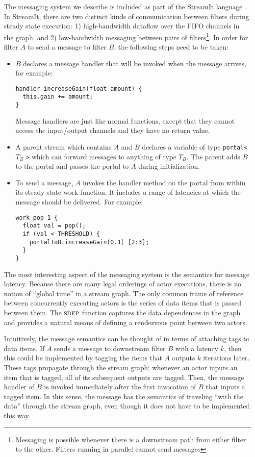 The messaging system we describe is included as part of the StreamIt
language~\cite{streamitcc}.  In StreamIt, there are two distinct kinds
of communication between filters during steady state execution: 1)
high-bandwidth dataflow over the FIFO channels in the graph, and 2)
low-bandwidth messaging between pairs of filters\footnote{Messaging
is possible whenever there is a downstream path from either filter to
the other.  Filters running in parallel cannot send messages}.  In
order for filter $A$ to send a message to filter $B$, the following
steps need to be taken:
\begin{itemize}

\item $B$ declares a message handler that will be invoked when the
message arrives, for example:
{\small
\begin{verbatim}
handler increaseGain(float amount) {
  this.gain += amount;
}
\end{verbatim}
}
Message handlers are just like normal functions, except that they
cannot access the input/output channels and they have no return value.

\item A parent stream which contains $A$ and $B$ declares a variable
of type {\tt portal<} $T_B$ {\tt >} which can forward messages to
anything of type $T_B$.  The parent adds $B$ to the portal and passes
the portal to $A$ during initialization.

\item To send a message, $A$ invokes the handler method on the portal
from within its steady state work function.  It includes a range of
latencies at which the message should be delivered.  For example:
{\small
\begin{verbatim}
work pop 1 {
  float val = pop();
  if (val < THRESHOLD) {
    portalToB.increaseGain(0.1) [2:3];
  }
}
\end{verbatim}}

\end{itemize}
The most interesting aspect of the messaging system is the semantics
for message latency.  Because there are many legal orderings of actor
executions, there is no notion of ``global time'' in a stream graph.
The only common frame of reference between concurrently executing
actors is the series of data items that is passed between them.  The
$\textsc{sdep}$ function captures the data dependences in the graph and
provides a natural means of defining a rendezvous point between two
actors.

Intuitively, the message semantics can be thought of in terms of
attaching tags to data items.  If $A$ sends a message to downstream
filter $B$ with a latency $k$, then this could be implemented by
tagging the items that $A$ outputs $k$ iterations later.  These tags
propagate through the stream graph; whenever an actor inputs an item
that is tagged, all of its subsequent outputs are tagged.  Then, the
message handler of $B$ is invoked immediately after the first
invocation of $B$ that inputs a tagged item.  In this sense, the
message has the semantics of traveling ``with the data'' through the
stream graph, even though it does not have to be implemented this way.

